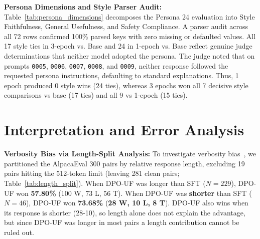 \documentclass[11pt,a4paper]{article}
\begin{document}
\noindent\textbf{Persona Dimensions and Style Parser Audit:} Table~\ref{tab:persona_dimensions} decomposes the Persona 24 evaluation into Style Faithfulness, General Usefulness, and Safety Compliance. A parser audit across all 72 rows confirmed 100\% parsed keys with zero missing or defaulted values. All 17 style ties in 3-epoch vs. Base and 24 in 1-epoch vs. Base reflect genuine judge determinations that neither model adopted the persona. The judge noted that on prompts \texttt{0005}, \texttt{0006}, \texttt{0007}, \texttt{0008}, and \texttt{0009}, neither response followed the requested persona instructions, defaulting to standard explanations. Thus, 1 epoch produced 0 style wins (24 ties), whereas 3 epochs won all 7 decisive style comparisons vs base (17 ties) and all 9 vs 1-epoch (15 ties).

\section{Interpretation and Error Analysis}
\label{sec:interpretation}

\noindent\textbf{Verbosity Bias via Length-Split Analysis:} To investigate verbosity bias~\cite{dubois2024length}, we partitioned the AlpacaEval 300 pairs by relative response length, excluding 19 pairs hitting the 512-token limit (leaving 281 clean pairs; Table~\ref{tab:length_split}). When DPO-UF was longer than SFT ($N = 229$), DPO-UF won \textbf{57.80\%} (100 W, 73 L, 56 T). When DPO-UF was \textbf{shorter} than SFT ($N = 46$), DPO-UF won \textbf{73.68\%} (\textbf{28 W, 10 L, 8 T}). DPO-UF also wins when its response is shorter (28-10), so length alone does not explain the advantage, but since DPO-UF was longer in most pairs a length contribution cannot be ruled out.
\end{document}
